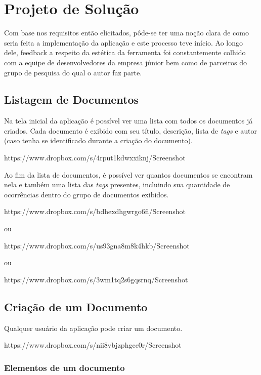 \chapter{Projeto de Solução}

Com base nos requisitos então elicitados, pôde-se ter uma noção clara de como seria feita a implementação da aplicação e este processo teve início. Ao longo dele, feedback a respeito da estética da ferramenta foi constantemente colhido com a equipe de desenvolvedores da empresa júnior bem como de parceiros do grupo de pesquisa do qual o autor faz parte.

\section{Listagem de Documentos}

Na tela inicial da aplicação é possível ver uma lista com todos os documentos já criados. Cada documento é exibido com seu título, descrição, lista de \textit{tags} e autor (caso tenha se identificado durante a criação do documento).

https://www.dropbox.com/s/4rput1kdwxxiknj/Screenshot%

Ao fim da lista de documentos, é possível ver quantos documentos se encontram nela e também uma lista das \textit{tags} presentes, incluindo sua quantidade de ocorrências dentro do grupo de documentos exibidos.

https://www.dropbox.com/s/bdhexdhgwrgo6fl/Screenshot%

ou

https://www.dropbox.com/s/us93gna8m8k4hkb/Screenshot%

ou

https://www.dropbox.com/s/3wm1tq2s6gqsrnq/Screenshot%

\section{Criação de um Documento}

Qualquer usuário da aplicação pode criar um documento.

https://www.dropbox.com/s/nii8vbjzphgce0r/Screenshot%

\subsection{Elementos de um documento}

